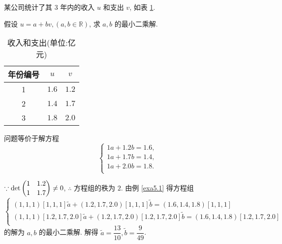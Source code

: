 \documentclass{ctexart}
\begin{document}
\begin{exercisec}%
    某公司统计了其 3 年内的收入 $u$ 和支出 $v$, 如表 \ref{tb1}.
    
    假设 $u=a+bv,(a,b\in\mathbb{R})$, 求 $a,b$ 的最小二乘解.
\end{exercisec}
\begin{table}[htbp!]
    \centering
    \begin{tabular}{c|cc}
        年份编号 & $u$ & $v$ \\
        \hline
        1 & $1.6$ & $1.2$ \\
        2 & $1.4$ & $1.7$ \\
        3 & $1.8$ & $2.0$ \\
    \end{tabular}
    \caption{收入和支出(单位:亿元)}\label{tb1}
\end{table}
\begin{solution}
    问题等价于解方程
    \[\begin{cases}
        1a+1.2b=1.6, \\
        1a+1.7b=1.4, \\
        1a+2.0b=1.8. \\
    \end{cases}\]

    $\because\det\dbinom{1\quad1.2}{1\quad1.7}\neq0$, $\therefore$ 方程组的秩为 $2$. 由例 \ref{exa5.1} 得方程组
    \[\begin{cases}
        (1,1,1)[1,1,1]\tilde{a}+(1.2,1.7,2.0)[1,1,1]\tilde{b}=(1.6,1.4,1.8)[1,1,1] \\
        (1,1,1)[1.2,1.7,2.0]\tilde{a}+(1.2,1.7,2.0)[1.2,1.7,2.0]\tilde{b}=(1.6,1.4,1.8)[1.2,1.7,2.0] \\
    \end{cases}\]
    的解为 $a,b$ 的最小二乘解. 解得 $\tilde{a}=\dfrac{13}{10},\tilde{b}=\dfrac{9}{49}$.
\end{solution}
\end{document}
